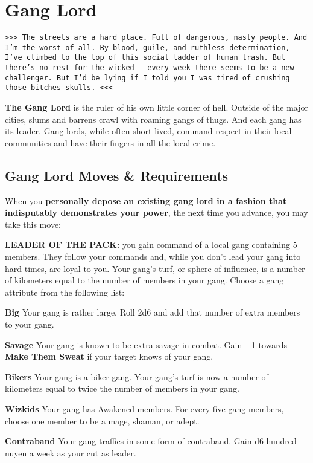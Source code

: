 \documentclass[oneside,10pt]{article}
\begin{document}
\section{Gang Lord}
\begin{multicols}{2}

\texttt{>>> The streets are a hard place. Full of
  dangerous, nasty people. And I'm the worst of
  all. By blood, guile, and ruthless
  determination, I've climbed to the top of this
  social ladder of human trash. But there's no
  rest for the wicked - every week there seems to
  be a new challenger. But I'd be lying if I told
  you I was tired of crushing those bitches skulls. <<<}

\textbf{The Gang Lord} is the ruler of his own little
corner of hell. Outside of the major cities, slums
and barrens crawl with roaming gangs of thugs. And
each gang has its leader. Gang lords, while often
short lived, command respect in their local
communities and have their fingers in all the
local crime. 

\subsection{Gang Lord Moves \& Requirements}

When you \textbf{personally depose an existing
  gang lord in a fashion that indisputably
  demonstrates your power}, the next
time you advance, you may take this move:

\textbf{LEADER OF THE PACK:} you gain command of a
local gang containing 5 members. They follow your commands and, while
you don't lead your gang into hard times, are
loyal to you. Your gang's turf, or sphere of
influence, is a number of kilometers equal to the
number of members in your gang. Choose a gang attribute from the
following list:
\begin{dent}
\textbf{Big} Your gang is rather large. Roll 2d6
and add that number of extra members to your gang.

\textbf{Savage} Your gang is known to be extra
savage in combat. Gain +1 towards \textbf{Make
  Them Sweat} if your target knows of your gang.

\textbf{Bikers} Your gang is a biker gang. Your
gang's turf is now a number of kilometers equal to
twice the number of members in your gang.

\textbf{Wizkids} Your gang has Awakened
members. For every five gang members, choose one
member to be a mage, shaman, or adept.

\textbf{Contraband} Your gang traffics in some
form of contraband. Gain d6 hundred nuyen a week
as your cut as leader.


\end{dent}
\end{multicols}
\end{document}
